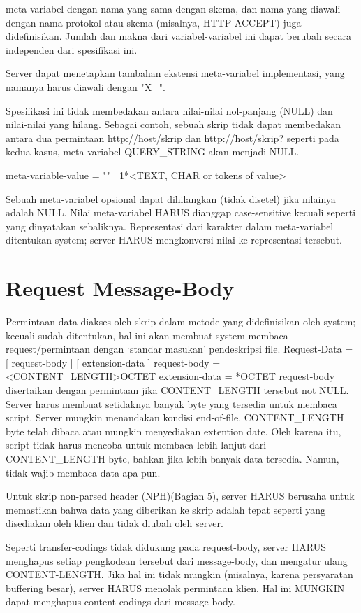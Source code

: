 \documentclass{article}
\begin{document}
meta-variabel dengan nama yang sama dengan skema, dan nama yang diawali
dengan nama protokol atau skema (misalnya, HTTP ACCEPT) juga
didefinisikan. Jumlah dan makna dari variabel-variabel ini dapat berubah
secara independen dari spesifikasi ini.

Server dapat menetapkan tambahan ekstensi meta-variabel implementasi, yang namanya harus diawali dengan "X_".

Spesifikasi ini tidak membedakan antara nilai-nilai nol-panjang (NULL) dan nilai-nilai yang hilang. Sebagai contoh, sebuah skrip tidak dapat membedakan antara dua permintaan http://host/skrip dan http://host/skrip?  seperti pada kedua kasus, meta-variabel QUERY_STRING akan menjadi NULL.

meta-variable-value = "" | 1*<TEXT, CHAR or tokens of value>

Sebuah meta-variabel opsional dapat dihilangkan (tidak disetel) jika nilainya adalah NULL. Nilai meta-variabel HARUS dianggap case-sensitive kecuali seperti yang dinyatakan sebaliknya. Representasi dari karakter dalam meta-variabel ditentukan system; server HARUS mengkonversi nilai ke representasi tersebut.

\section{Request Message-Body}
Permintaan data diakses oleh skrip dalam metode yang didefinisikan oleh system; kecuali sudah ditentukan, hal ini akan membuat system membaca request/permintaan dengan ‘standar masukan’ pendeskripsi file.
	  Request-Data   = [ request-body ] [ extension-data ]
      request-body   = <CONTENT_LENGTH>OCTET
      extension-data = *OCTET
request-body disertaikan dengan permintaan jika CONTENT_LENGTH tersebut not NULL. Server harus membuat setidaknya banyak byte yang tersedia untuk membaca script. Server mungkin menandakan kondisi end-of-file. CONTENT_LENGTH byte telah dibaca atau mungkin menyediakan extention date. Oleh karena itu, script tidak harus mencoba untuk membaca lebih lanjut dari CONTENT_LENGTH byte, bahkan jika lebih banyak data tersedia. Namun, tidak wajib membaca data apa pun.

Untuk skrip non-parsed header (NPH)(Bagian 5), server HARUS berusaha untuk memastikan bahwa data yang diberikan ke skrip adalah tepat seperti yang disediakan oleh klien dan tidak diubah oleh server.

Seperti transfer-codings tidak didukung pada request-body, server HARUS menghapus setiap pengkodean tersebut dari message-body, dan mengatur ulang CONTENT-LENGTH. Jika hal ini tidak mungkin (misalnya, karena persyaratan buffering besar), server HARUS menolak permintaan klien. Hal ini MUNGKIN dapat menghapus content-codings dari message-body.
\end{document}
